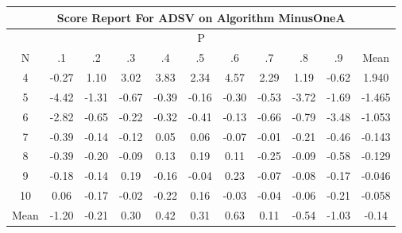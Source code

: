 \documentclass[11pt,a4paper]{report}
\begin{document}
\begin{longtable}{ | c || c | c | c | c | c | c | c | c | c || c |}
\hline
\multicolumn{11}{|c|}{ Score Report For ADSV on Algorithm MinusOneA} \\
\hline
\multicolumn{11}{|c|}{ P } \\
\hline
N & .1 & .2 & .3 & .4 & .5 & .6 & .7 & .8 & .9 & Mean\\
 \hline
 \hline
 \endhead
  4 &  \cellcolor[HTML]{FFF7F7} -0.27 &  \cellcolor[HTML]{E7E7FF} 1.10 &  \cellcolor[HTML]{AFAFFF} 3.02 &  \cellcolor[HTML]{9F9FFF} 3.83 &  \cellcolor[HTML]{C7C7FF} 2.34 &  \cellcolor[HTML]{8F8FFF} 4.57 &  \cellcolor[HTML]{C7C7FF} 2.29 &  \cellcolor[HTML]{DFDFFF} 1.19 &  \cellcolor[HTML]{FFEFEF} -0.62 & 1.940 \\
  5 &  \cellcolor[HTML]{FF8F8F} -4.42 &  \cellcolor[HTML]{FFDFDF} -1.31 &  \cellcolor[HTML]{FFEFEF} -0.67 &  \cellcolor[HTML]{FFF7F7} -0.39 &  \cellcolor[HTML]{FFF7F7} -0.16 &  \cellcolor[HTML]{FFF7F7} -0.30 &  \cellcolor[HTML]{FFEFEF} -0.53 &  \cellcolor[HTML]{FF9F9F} -3.72 &  \cellcolor[HTML]{FFD7D7} -1.69 & -1.465 \\
  6 &  \cellcolor[HTML]{FFB7B7} -2.82 &  \cellcolor[HTML]{FFEFEF} -0.65 &  \cellcolor[HTML]{FFF7F7} -0.22 &  \cellcolor[HTML]{FFF7F7} -0.32 &  \cellcolor[HTML]{FFF7F7} -0.41 &  \cellcolor[HTML]{FFFFFF} -0.13 &  \cellcolor[HTML]{FFEFEF} -0.66 &  \cellcolor[HTML]{FFE7E7} -0.79 &  \cellcolor[HTML]{FFA7A7} -3.48 & -1.053 \\
  7 &  \cellcolor[HTML]{FFF7F7} -0.39 &  \cellcolor[HTML]{FFFFFF} -0.14 &  \cellcolor[HTML]{FFFFFF} -0.12 &  \cellcolor[HTML]{FFFFFF} 0.05 &  \cellcolor[HTML]{FFFFFF} 0.06 &  \cellcolor[HTML]{FFFFFF} -0.07 &  \cellcolor[HTML]{FFFFFF} -0.01 &  \cellcolor[HTML]{FFF7F7} -0.21 &  \cellcolor[HTML]{FFF7F7} -0.46 & -0.143 \\
  8 &  \cellcolor[HTML]{FFF7F7} -0.39 &  \cellcolor[HTML]{FFF7F7} -0.20 &  \cellcolor[HTML]{FFFFFF} -0.09 &  \cellcolor[HTML]{FFFFFF} 0.13 &  \cellcolor[HTML]{F7F7FF} 0.19 &  \cellcolor[HTML]{FFFFFF} 0.11 &  \cellcolor[HTML]{FFF7F7} -0.25 &  \cellcolor[HTML]{FFFFFF} -0.09 &  \cellcolor[HTML]{FFEFEF} -0.58 & -0.129 \\
  9 &  \cellcolor[HTML]{FFF7F7} -0.18 &  \cellcolor[HTML]{FFFFFF} -0.14 &  \cellcolor[HTML]{F7F7FF} 0.19 &  \cellcolor[HTML]{FFF7F7} -0.16 &  \cellcolor[HTML]{FFFFFF} -0.04 &  \cellcolor[HTML]{F7F7FF} 0.23 &  \cellcolor[HTML]{FFFFFF} -0.07 &  \cellcolor[HTML]{FFFFFF} -0.08 &  \cellcolor[HTML]{FFF7F7} -0.17 & -0.046 \\
  10 &  \cellcolor[HTML]{FFFFFF} 0.06 &  \cellcolor[HTML]{FFF7F7} -0.17 &  \cellcolor[HTML]{FFFFFF} -0.02 &  \cellcolor[HTML]{FFF7F7} -0.22 &  \cellcolor[HTML]{FFFFFF} 0.16 &  \cellcolor[HTML]{FFFFFF} -0.03 &  \cellcolor[HTML]{FFFFFF} -0.04 &  \cellcolor[HTML]{FFFFFF} -0.06 &  \cellcolor[HTML]{FFF7F7} -0.21 & -0.058 \\
 \hline
 \hline
Mean &  \cellcolor[HTML]{FFDFDF} -1.20 &  \cellcolor[HTML]{FFF7F7} -0.21 &  \cellcolor[HTML]{F7F7FF} 0.30 &  \cellcolor[HTML]{F7F7FF} 0.42 &  \cellcolor[HTML]{F7F7FF} 0.31 &  \cellcolor[HTML]{EFEFFF} 0.63 &  \cellcolor[HTML]{FFFFFF} 0.11 &  \cellcolor[HTML]{FFEFEF} -0.54 &  \cellcolor[HTML]{FFE7E7} -1.03 &  \cellcolor[HTML]{FFFFFF} -0.14
\end{longtable}
\end{document}
